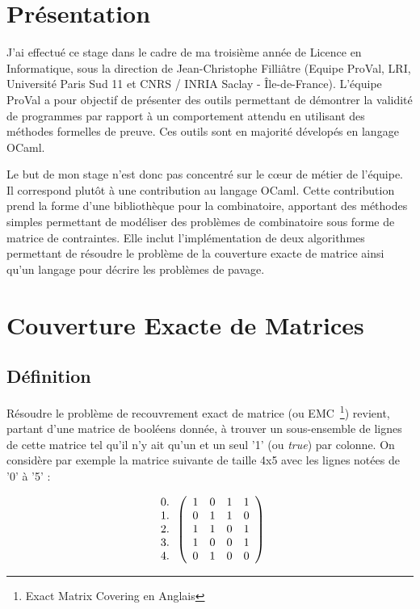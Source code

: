 \documentclass[a4paper]{article}
\begin{document}
\newpage
\tableofcontents
\newpage
\listoffigures

\newpage
\section{Présentation}


J'ai effectué ce stage dans le cadre de ma troisième année de Licence en 
Informatique, sous la direction de Jean-Christophe Filliâtre (Equipe ProVal, 
LRI, Université Paris Sud 11 et CNRS / INRIA Saclay - Île-de-France). L'équipe 
ProVal a pour objectif de présenter des outils permettant de démontrer la 
validité de programmes par rapport à un comportement attendu en utilisant des
méthodes formelles de preuve.
Ces outils sont en majorité dévelopés en langage OCaml. 

Le but de mon stage n'est donc pas concentré sur le c\oe ur de métier de 
l'équipe. Il correspond plutôt à une contribution au langage OCaml. 
Cette contribution
prend la forme d'une bibliothèque pour la combinatoire, apportant
des méthodes simples permettant de modéliser des problèmes de combinatoire
sous forme de matrice de contraintes. Elle inclut l'implémentation de 
deux algorithmes permettant de résoudre le problème de la couverture exacte de
matrice ainsi qu'un langage pour décrire les problèmes de pavage.


\section{Couverture Exacte de Matrices}

\subsection{Définition}

Résoudre le problème de recouvrement exact de matrice 
(ou EMC~\footnote{Exact Matrix Covering en Anglais}) revient,
partant d'une matrice de booléens donnée, à trouver un sous-ensemble de 
lignes de cette matrice tel qu'il n'y ait qu'un et un seul '1' (ou \emph{true}) 
par colonne.
On considère par exemple la matrice suivante de taille 4x5 avec les lignes
notées de '0' à '5' : 

\[
  \begin{array}{ c }
   0. \\
   1. \\
   2. \\
   3. \\
   4. \\
  \end{array}
\left(
  \begin{array}{ c c c c c }
   1 & 0 & 1 & 1 \\
   0 & 1 & 1 & 0 \\
   1 & 1 & 0 & 1 \\
   1 & 0 & 0 & 1 \\
   0 & 1 & 0 & 0
  \end{array} \right)
\]
\end{document}
